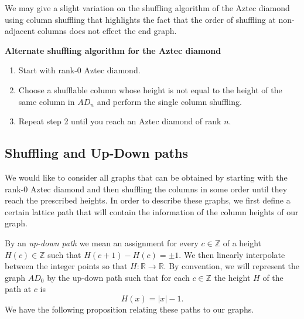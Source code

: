 \documentclass[12pt]{amsart}
\newcommand{\R}{{\mathbb R}}
\numberwithin{equation}{section}
\theoremstyle{definition}
\begin{document}
We may give a slight variation on the shuffling algorithm of the Aztec diamond using column shuffling that highlights the fact that the order of shuffling at non-adjacent columns does not effect the end graph.
\begin{center}
 \textbf{Alternate shuffling algorithm for the Aztec diamond}  
 \begin{enumerate}
 \item Start with  rank-$0$ Aztec diamond.
 \item Choose a shufflable column whose height is not equal to the height of the same column in $AD_n$ and perform the single column shuffling.
 \item Repeat step 2 until you reach an Aztec diamond of rank $n$.
 \end{enumerate}
\end{center}

\subsection{Shuffling and Up-Down paths}\label{sect: shufupdown}

We would like to consider all graphs that can be obtained by starting with the rank-$0$ Aztec diamond and then shuffling the columns in some order until they reach the prescribed heights.
In order to describe these graphs, we first define a certain lattice path that will contain the information of the column heights of our graph. 

By an \emph{up-down path} we mean an assignment for every $c\in \mathbb{Z}$ of a height $H(c)\in\mathbb{Z}$ such that $H(c+1)-H(c)=\pm 1$. We then linearly interpolate between the integer points so that $H:\R\to\R$. By convention, we will represent the graph $AD_0$ by the up-down path such that for each $c\in \mathbb{Z}$ the height $H$ of the path at $c$ is
\[
H(x) = |x|-1.
\]
We have the following proposition relating these paths to our graphs.
\end{document}
